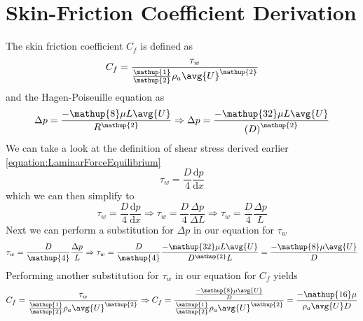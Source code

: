 


















\section{Skin-Friction Coefficient Derivation }
\label{appendix:b}
The skin friction coefficient \( C_f \) is defined as
\begin{equation}
    C_f = \frac{\tau_w}{\frac{\mathup{1}}{\mathup{2}}\rho_a \avg{U}^\mathup{2}}
\end{equation}
and the Hagen-Poiseuille equation as
\begin{equation}
    \Delta p = \frac{-\mathup{8} \mu L \avg{U}}{R^\mathup{2}} \Rightarrow \Delta p = \frac{-\mathup{32} \mu L \avg{U}}{\left(D\right)^\mathup{2}}
\end{equation}
We can take a look at the definition of shear stress derived earlier \eqref{equation:LaminarForceEquilibrium}
\begin{equation}
    \tau_w = \frac{D}{\mathup{4}}\frac{\mathrm{d}p}{\mathrm{d}x}
\end{equation}
which we can then simplify to
\begin{equation}
    \tau_w = \frac{D}{\mathup{4}} \frac{\mathrm{d}p}{\mathrm{d}x} \Rightarrow \tau_w = \frac{D}{\mathup{4}} \frac{\Delta p}{\Delta L} \Rightarrow \tau_w = \frac{D}{\mathup{4}}\frac{\Delta p}{L}
\end{equation}
Next we can perform a substitution for \( \Delta p \) in our equation for \( \tau_w \)
\begin{equation}
    \tau_w = \frac{D}{\mathup{4}}\frac{\Delta p}{L} \Rightarrow \tau_w = \frac{D}{\mathup{4}}\frac{-\mathup{32} \mu L \avg{U}}{D^\mathup{2} L} = \frac{-\mathup{8} \mu \avg{U}}{D}
\end{equation}
Performing another substitution for \( \tau_w \) in our equation for \( C_f \) yields
\begin{equation}
    C_f = \frac{\tau_w}{\frac{\mathup{1}}{\mathup{2}}\rho_a \avg{U}^\mathup{2}} \Rightarrow C_f = \frac{\frac{-\mathup{8}\mu \avg{U}}{D}}{\frac{\mathup{1}}{\mathup{2}}\rho_a \avg{U}^\mathup{2}} = \frac{-\mathup{16}\mu}{\rho_a \avg{U}D}
\end{equation}
